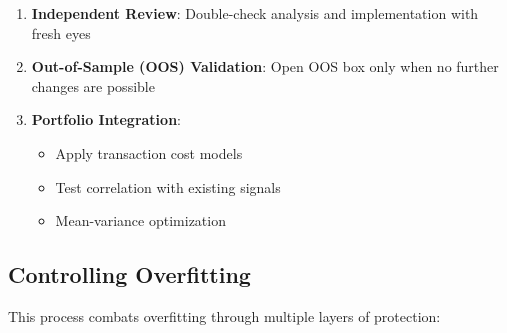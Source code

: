 \documentclass[11pt, letterpaper]{article}
\begin{document}
\begin{enumerate}
    \item \textbf{Independent Review}: Double-check analysis and implementation
      with fresh eyes

    \item \textbf{Out-of-Sample (OOS) Validation}: Open OOS box only when
      no further changes are possible

    \item \textbf{Portfolio Integration}:

      \begin{itemize}
        \item Apply transaction cost models

        \item Test correlation with existing signals

        \item Mean-variance optimization
      \end{itemize}
  \end{enumerate}

  \subsection{Controlling Overfitting}
  \label{controlling-overfitting}

  This process combats overfitting through multiple layers of protection:
\end{document}
